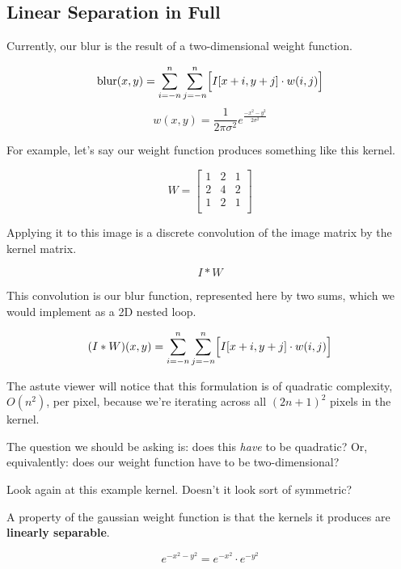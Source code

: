 \documentclass{article}
\begin{document}
\begin{appendices}
\section{Linear Separation in Full}

Currently, our blur is the result of a two-dimensional weight function.

\[
    \text{blur}(x, y) = \sum^{n}_{i=-n} \sum^{n}_{j=-n} \Bigl[ I[x+i, y+j] \cdot w(i, j) \Bigr]
\]
\[
    w(x, y) = \frac{1}{2 \pi \sigma^2} e^{\frac{- x^2 - y^2}{2 \sigma^2}}
\]

For example, let's say our weight function produces something like this kernel. %

\[
    W =
    \begin{bmatrix}
        1 & 2 & 1 \\
        2 & 4 & 2 \\
        1 & 2 & 1 \\
    \end{bmatrix}
\]

Applying it to this image is a discrete convolution of the image matrix by the kernel matrix.

\[
    I * W
\]


This convolution is our blur function, represented here by two sums, which we would implement as a 2D nested loop.

\[
    (I * W)(x, y) = \sum^{n}_{i=-n} \sum^{n}_{j=-n} \Bigl[ I[x+i, y+j] \cdot w(i, j)\Bigr]
\]

The astute viewer will notice that this formulation is of quadratic complexity, $O(n^2)$, per pixel, because we're iterating across all $(2n+1)^2$ pixels in the kernel.

The question we should be asking is: does this \textit{have} to be quadratic? Or, equivalently: does our weight function have to be two-dimensional?

Look again at this example kernel. Doesn't it look sort of symmetric?

A property of the gaussian weight function is that the kernels it produces are \textbf{linearly separable}.

\[
    e^{- x^2 - y^2} = e^{-x^2} \cdot e^{-y^2}
\]


\end{appendices}
\end{document}
